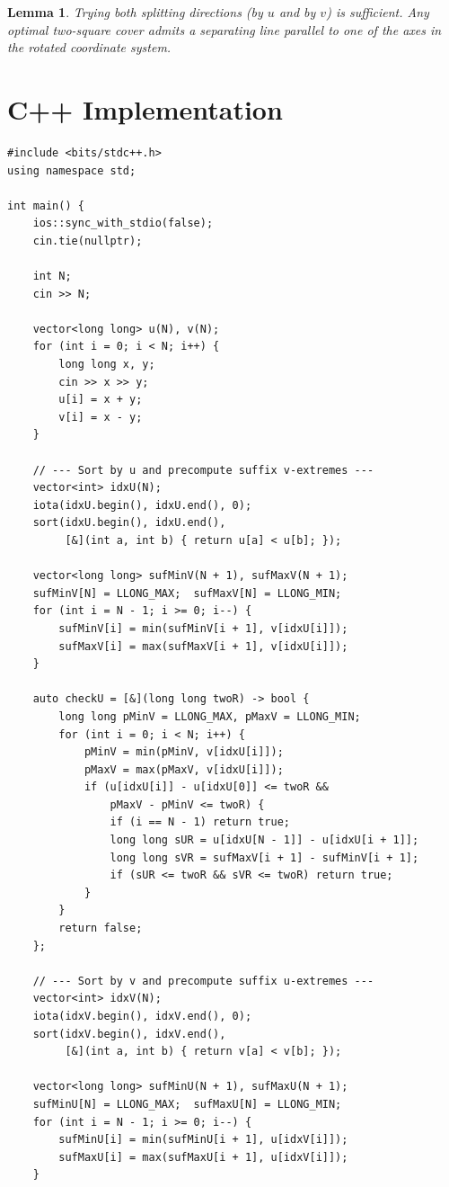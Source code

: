 \documentclass[11pt,a4paper]{article}
\newtheorem{lemma}[theorem]{Lemma}
\begin{document}
\begin{lemma}
Trying both splitting directions (by $u$ and by $v$) is sufficient.
Any optimal two-square cover admits a separating line parallel to one
of the axes in the rotated coordinate system.
\end{lemma}

\section{C++ Implementation}

\begin{lstlisting}
#include <bits/stdc++.h>
using namespace std;

int main() {
    ios::sync_with_stdio(false);
    cin.tie(nullptr);

    int N;
    cin >> N;

    vector<long long> u(N), v(N);
    for (int i = 0; i < N; i++) {
        long long x, y;
        cin >> x >> y;
        u[i] = x + y;
        v[i] = x - y;
    }

    // --- Sort by u and precompute suffix v-extremes ---
    vector<int> idxU(N);
    iota(idxU.begin(), idxU.end(), 0);
    sort(idxU.begin(), idxU.end(),
         [&](int a, int b) { return u[a] < u[b]; });

    vector<long long> sufMinV(N + 1), sufMaxV(N + 1);
    sufMinV[N] = LLONG_MAX;  sufMaxV[N] = LLONG_MIN;
    for (int i = N - 1; i >= 0; i--) {
        sufMinV[i] = min(sufMinV[i + 1], v[idxU[i]]);
        sufMaxV[i] = max(sufMaxV[i + 1], v[idxU[i]]);
    }

    auto checkU = [&](long long twoR) -> bool {
        long long pMinV = LLONG_MAX, pMaxV = LLONG_MIN;
        for (int i = 0; i < N; i++) {
            pMinV = min(pMinV, v[idxU[i]]);
            pMaxV = max(pMaxV, v[idxU[i]]);
            if (u[idxU[i]] - u[idxU[0]] <= twoR &&
                pMaxV - pMinV <= twoR) {
                if (i == N - 1) return true;
                long long sUR = u[idxU[N - 1]] - u[idxU[i + 1]];
                long long sVR = sufMaxV[i + 1] - sufMinV[i + 1];
                if (sUR <= twoR && sVR <= twoR) return true;
            }
        }
        return false;
    };

    // --- Sort by v and precompute suffix u-extremes ---
    vector<int> idxV(N);
    iota(idxV.begin(), idxV.end(), 0);
    sort(idxV.begin(), idxV.end(),
         [&](int a, int b) { return v[a] < v[b]; });

    vector<long long> sufMinU(N + 1), sufMaxU(N + 1);
    sufMinU[N] = LLONG_MAX;  sufMaxU[N] = LLONG_MIN;
    for (int i = N - 1; i >= 0; i--) {
        sufMinU[i] = min(sufMinU[i + 1], u[idxV[i]]);
        sufMaxU[i] = max(sufMaxU[i + 1], u[idxV[i]]);
    }


\end{lstlisting}
\end{document}
